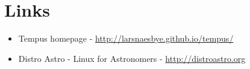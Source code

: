 \section{Links}

\begin{itemize}
    \item Tempus homepage - \url{http://larsnaesbye.github.io/tempus/}
    \item Distro Astro - Linux for Astronomers - \url{http://distroastro.org}
\end{itemize}


